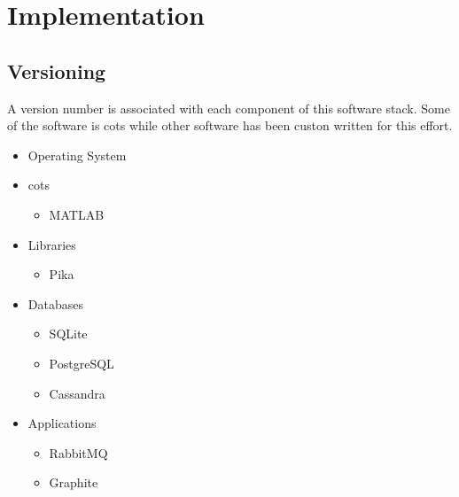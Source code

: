 \section{Implementation}
\subsection{Versioning}
A version number is associated with each component of this software stack. Some of the software is \ac{cots} while other software has been custon written for this effort.

\begin{itemize}
	\item Operating System
	\item \ac{cots}
	\begin{itemize}
		\item MATLAB
	\end{itemize}
	\item Libraries
	\begin{itemize}
		\item Pika
	\end{itemize}
	\item Databases
	\begin{itemize}
		\item SQLite
		\item PostgreSQL
		\item Cassandra
	\end{itemize}
	\item Applications
	\begin{itemize}
		\item RabbitMQ
		\item Graphite
	\end{itemize}
\end{itemize}

\fi
